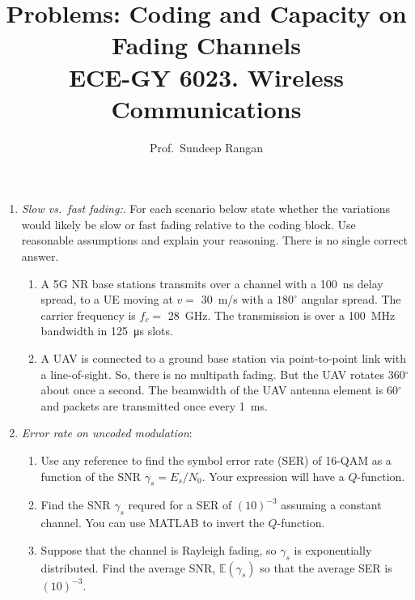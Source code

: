 \documentclass[11pt]{article}
\def\Exp{\mathbb{E}}
\begin{document}
\title{Problems:  Coding and Capacity on Fading Channels\\
ECE-GY 6023. Wireless Communications}
\author{Prof.\ Sundeep Rangan}
\date{}

\maketitle


\begin{enumerate}

\item \emph{Slow vs.\ fast fading:}.
For each scenario below state whether the variations would likely be 
slow or fast fading relative to the coding block. 
Use reasonable assumptions and explain your reasoning.  There is no single correct answer.
\begin{enumerate}[label=(\alph*)]
\item A 5G NR base stations transmits over a channel with a \SI{100}{ns} delay spread,
to a UE moving at $v=$ \SI{30}{m/s} with a $180^\circ$ angular spread.
The carrier frequency is $f_c=$ \SI{28}{GHz}.
The transmission is over a \SI{100}{MHz} bandwidth in \SI{125}{\micro\second} slots.
\item A UAV is connected to a ground base station via point-to-point link with a line-of-sight.
So, there is no multipath fading.  But the UAV rotates 360$^\circ$ about once a second.
The beamwidth of the UAV 
antenna element is 60$^\circ$ and packets are transmitted once every \SI{1}{ms}.
\end{enumerate}

\item \emph{Error rate on uncoded modulation}:
\begin{enumerate}[label=(\alph*)]
\item Use any reference to find the symbol error rate (SER) of 16-QAM as
a function of the SNR $\gamma_s = E_s/N_0$.  Your expression will have a $Q$-function.
\item Find the SNR $\gamma_s$ requred for a SER of $(10)^{-3}$ assuming a constant channel.  
You can use MATLAB to invert the $Q$-function.
\item Suppose that the channel is Rayleigh fading, so $\gamma_s$ is exponentially distributed.
Find the average SNR, $\Exp(\gamma_s)$ so that the average SER is $(10)^{-3}$.
\end{enumerate}


\end{enumerate}
\end{document}
